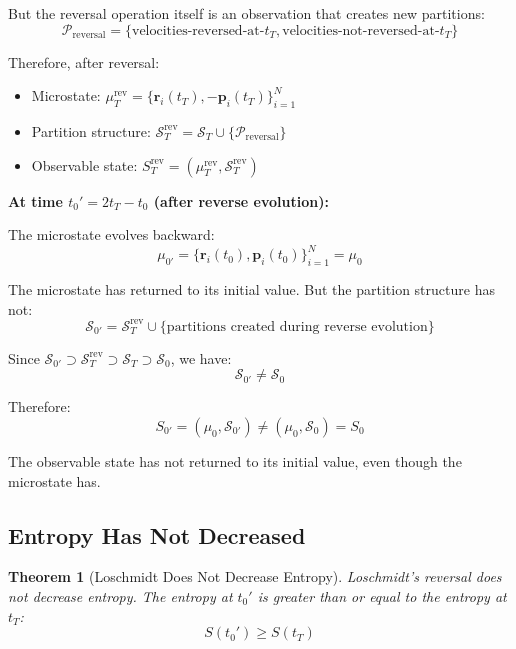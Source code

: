\documentclass[twocolumn,10pt]{article}
\newtheorem{theorem}{Theorem}[section]
\theoremstyle{definition}
\theoremstyle{remark}
\begin{document}
But the reversal operation itself is an observation that creates new partitions:
\begin{equation}
\mathcal{P}_{\text{reversal}} = \{\text{velocities-reversed-at-}t_T, \text{velocities-not-reversed-at-}t_T\}
\end{equation}

Therefore, after reversal:
\begin{itemize}
\item Microstate: $\mu_T^{\text{rev}} = \{\mathbf{r}_i(t_T), -\mathbf{p}_i(t_T)\}_{i=1}^N$
\item Partition structure: $\mathcal{S}_T^{\text{rev}} = \mathcal{S}_T \cup \{\mathcal{P}_{\text{reversal}}\}$
\item Observable state: $S_T^{\text{rev}} = (\mu_T^{\text{rev}}, \mathcal{S}_T^{\text{rev}})$
\end{itemize}

\noindent\textbf{At time $t_0' = 2t_T - t_0$ (after reverse evolution):}

The microstate evolves backward:
\begin{equation}
\mu_{0'} = \{\mathbf{r}_i(t_0), \mathbf{p}_i(t_0)\}_{i=1}^N = \mu_0
\end{equation}

The microstate has returned to its initial value. But the partition structure has not:
\begin{equation}
\mathcal{S}_{0'} = \mathcal{S}_T^{\text{rev}} \cup \{\text{partitions created during reverse evolution}\}
\end{equation}

Since $\mathcal{S}_{0'} \supset \mathcal{S}_T^{\text{rev}} \supset \mathcal{S}_T \supset \mathcal{S}_0$, we have:
\begin{equation}
\mathcal{S}_{0'} \neq \mathcal{S}_0
\end{equation}

Therefore:
\begin{equation}
S_{0'} = (\mu_0, \mathcal{S}_{0'}) \neq (\mu_0, \mathcal{S}_0) = S_0
\end{equation}

The observable state has not returned to its initial value, even though the microstate has.

\subsection{Entropy Has Not Decreased}

\begin{theorem}[Loschmidt Does Not Decrease Entropy]
\label{thm:loschmidt_no_decrease}
Loschmidt's reversal does not decrease entropy. The entropy at $t_0'$ is greater than or equal to the entropy at $t_T$:
\begin{equation}
S(t_0') \geq S(t_T)
\end{equation}
\end{theorem}
\end{document}
